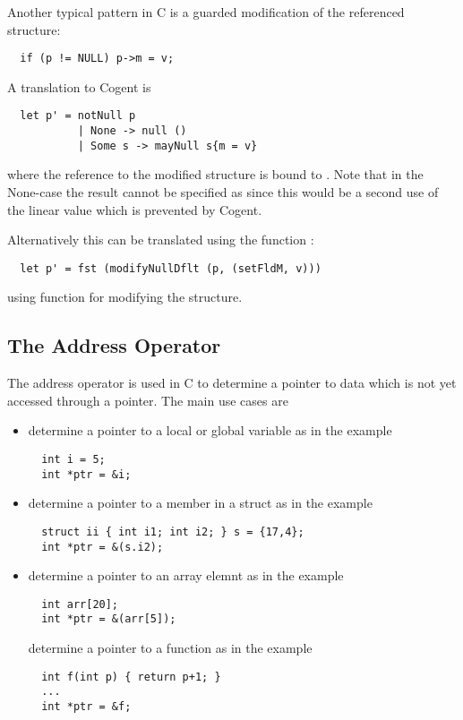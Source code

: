 Another typical pattern in C is a guarded modification of the referenced structure:
\begin{verbatim}
  if (p != NULL) p->m = v;
\end{verbatim}
A translation to Cogent is
\begin{verbatim}
  let p' = notNull p 
           | None -> null ()
           | Some s -> mayNull s{m = v}
\end{verbatim}
where the reference to the modified structure is bound to . Note that in the None-case the result cannot be specified as 
 since this would be a second use of the linear value  which is prevented by Cogent.

Alternatively this can be translated using the function :
\begin{verbatim}
  let p' = fst (modifyNullDflt (p, (setFldM, v)))
\end{verbatim}
using function  for modifying the structure.

\subsection{The Address Operator \code{\&}}
\label{app-transfunction-addrop}

The address operator \code{\&} is used in C to determine a pointer to data which is not yet accessed through a 
pointer. The main use cases are
\begin{itemize}
\item determine a pointer to a local or global variable as in the example
\begin{verbatim}
  int i = 5;
  int *ptr = &i;
\end{verbatim}

\item determine a pointer to a member in a struct as in the example
\begin{verbatim}
  struct ii { int i1; int i2; } s = {17,4};
  int *ptr = &(s.i2);
\end{verbatim}

\item determine a pointer to an array elemnt as in the example
\begin{verbatim}
  int arr[20];
  int *ptr = &(arr[5]);
\end{verbatim}

determine a pointer to a function as in the example
\begin{verbatim}
  int f(int p) { return p+1; }
  ...
  int *ptr = &f;
\end{verbatim}
\end{itemize}


